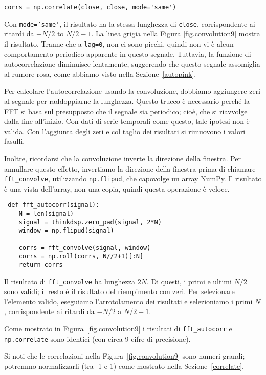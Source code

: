 \documentclass[12pt]{book} \usepackage[width=5.5in,height=8.5in, hmarginratio=3:2,vmarginratio=1:1]{geometry}
\begin{document}
\begin{verbatim} 
corrs = np.correlate(close, close, mode='same')
 \end{verbatim} 

Con {\tt mode='same'}, il risultato ha la stessa lunghezza di {\tt close}, corrispondente ai ritardi da $-N/2$ to $N/2-1$. La linea grigia nella Figura \ref{fig.convolution9} mostra il risultato. Tranne che a {\tt lag=0}, non ci sono picchi, quindi non vi è alcun comportamento periodico apparente in questo segnale. Tuttavia, la funzione di autocorrelazione diminuisce lentamente, suggerendo che questo segnale assomiglia al rumore rosa, come abbiamo visto nella Sezione~\ref{autopink}.

Per calcolare l'autocorrelazione usando la convoluzione, dobbiamo aggiungere zeri al segnale per raddoppiarne la lunghezza. Questo trucco è necessario perché la FFT si basa sul presupposto che il segnale sia periodico; cioè, che si riavvolge dalla fine all'inizio. Con dati di serie temporali come questo, tale ipotesi non è valida. Con l'aggiunta degli zeri e col taglio dei risultati si rimuovono i valori fasulli.

Inoltre, ricordarsi che la convoluzione inverte la direzione della finestra. Per annullare questo effetto, invertiamo la direzione della finestra prima di chiamare \verb"fft_convolve", utilizzando {\tt np.flipud}, che capovolge un array NumPy. Il risultato è una vista dell'array, non una copia, quindi questa operazione è veloce.

\begin{verbatim} def fft_autocorr(signal):
    N = len(signal)
    signal = thinkdsp.zero_pad(signal, 2*N)
    window = np.flipud(signal)

    corrs = fft_convolve(signal, window)
    corrs = np.roll(corrs, N//2+1)[:N]
    return corrs
 \end{verbatim} 

Il risultato di \verb"fft_convolve" ha lunghezza $2N$. Di questi, i primi e ultimi $N/2$ sono validi; il resto è il risultato del riempimento con zeri. Per selezionare l'elemento valido, eseguiamo l'arrotolamento dei risultati e selezioniamo i primi $N$, corrispondente ai ritardi da $-N/2$ a $N/2-1$.

Come mostrato in Figura~\ref{fig.convolution9} i risultati di \verb"fft_autocorr" e {\tt np.correlate} sono identici (con circa 9 cifre di precisione).

Si noti che le correlazioni nella Figura~\ref{fig.convolution9} sono numeri grandi; potremmo normalizzarli (tra -1 e 1) come mostrato nella Sezione~\ref{correlate}.
\end{document}
